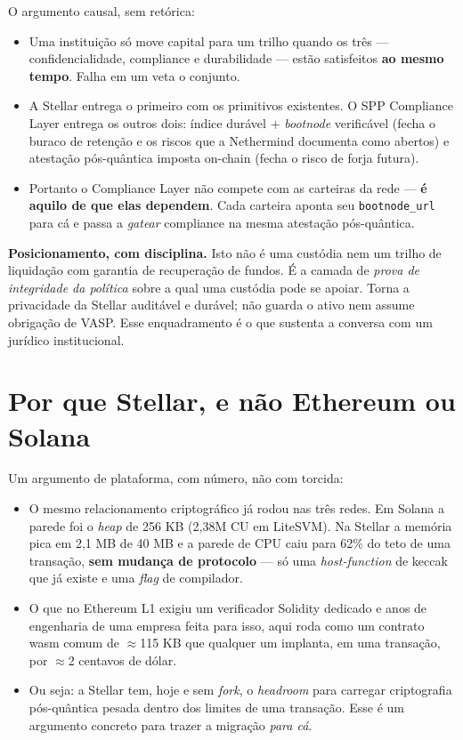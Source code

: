 \documentclass[11pt]{article}
\newcommand{\keybox}[1]{%
  \par\vspace{0.6em}%
  \noindent\colorbox{soft}{\parbox{\dimexpr\linewidth-2\fboxsep}{%
  \vspace{0.3em}\small #1\vspace{0.3em}}}%
  \par\vspace{0.6em}%
}
\newcommand{\code}[1]{\texttt{\small #1}}
\begin{document}
O argumento causal, sem retórica:

\begin{itemize}
\item Uma instituição só move capital para um trilho quando os três ---
confidencialidade, compliance e durabilidade --- estão satisfeitos \textbf{ao
mesmo tempo}. Falha em um veta o conjunto.
\item A Stellar entrega o primeiro com os primitivos existentes. O SPP Compliance
Layer entrega os outros dois: índice durável $+$ \emph{bootnode} verificável
(fecha o buraco de retenção e os riscos que a Nethermind documenta como abertos) e
atestação pós-quântica imposta on-chain (fecha o risco de forja futura).
\item Portanto o Compliance Layer não compete com as carteiras da rede --- \textbf{é
aquilo de que elas dependem}. Cada carteira aponta seu \code{bootnode\_url} para cá
e passa a \emph{gatear} compliance na mesma atestação pós-quântica.
\end{itemize}

\keybox{\textbf{Posicionamento, com disciplina.} Isto não é uma custódia nem um
trilho de liquidação com garantia de recuperação de fundos. É a camada de
\emph{prova de integridade da política} sobre a qual uma custódia pode se apoiar.
Torna a privacidade da Stellar auditável e durável; não guarda o ativo nem assume
obrigação de VASP. Esse enquadramento é o que sustenta a conversa com um jurídico
institucional.}

\section{Por que Stellar, e não Ethereum ou Solana}

Um argumento de plataforma, com número, não com torcida:

\begin{itemize}
\item O mesmo relacionamento criptográfico já rodou nas três redes. Em Solana a
parede foi o \emph{heap} de 256 KB (2,38M CU em LiteSVM). Na Stellar a memória
pica em 2,1 MB de 40 MB e a parede de CPU caiu para 62\% do teto de uma
transação, \textbf{sem mudança de protocolo} --- só uma \emph{host-function} de
keccak que já existe e uma \emph{flag} de compilador.
\item O que no Ethereum L1 exigiu um verificador Solidity dedicado e anos de
engenharia de uma empresa feita para isso, aqui roda como um contrato wasm comum
de $\approx$115 KB que qualquer um implanta, em uma transação, por $\approx$2
centavos de dólar.
\item Ou seja: a Stellar tem, hoje e sem \emph{fork}, o \emph{headroom} para
carregar criptografia pós-quântica pesada dentro dos limites de uma transação.
Esse é um argumento concreto para trazer a migração \emph{para cá}.
\end{itemize}
\end{document}
